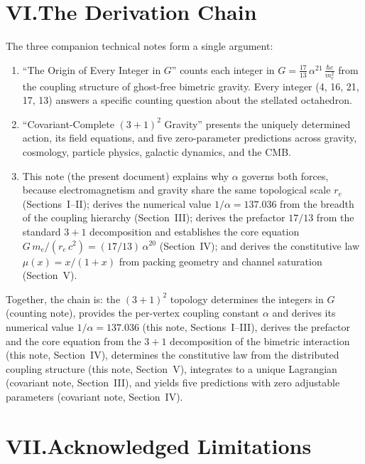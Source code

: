 \documentclass[11pt]{article}
\begin{document}
\section*{VI.\quad The Derivation Chain}

The three companion technical notes form a single argument:

\begin{enumerate}[leftmargin=2em]
\item ``The Origin of Every Integer in $G$'' counts each integer in $G = \frac{17}{13}\,\alpha^{21}\,\frac{\hbar c}{m_e^2}$ from the coupling structure of ghost-free bimetric gravity.
Every integer (4, 16, 21, 17, 13) answers a specific counting question about the stellated octahedron.

\item ``Covariant-Complete $(3+1)^2$ Gravity'' presents the uniquely determined action, its field equations, and five zero-parameter predictions across gravity, cosmology, particle physics, galactic dynamics, and the CMB.

\item This note (the present document) explains why $\alpha$ governs both forces, because electromagnetism and gravity share the same topological scale $r_e$ (Sections~I--II); derives the numerical value $1/\alpha = 137.036$ from the breadth of the coupling hierarchy (Section~III); derives the prefactor $17/13$ from the standard $3+1$ decomposition and establishes the core equation $G\,m_e/(r_e\,c^2) = (17/13)\,\alpha^{20}$ (Section~IV); and derives the constitutive law $\mu(x) = x/(1+x)$ from packing geometry and channel saturation (Section~V).
\end{enumerate}

Together, the chain is: the $(3+1)^2$ topology determines the integers in $G$ (counting note), provides the per-vertex coupling constant $\alpha$ and derives its numerical value $1/\alpha = 137.036$ (this note, Sections~I--III), derives the prefactor and the core equation from the $3+1$ decomposition of the bimetric interaction (this note, Section~IV), determines the constitutive law from the distributed coupling structure (this note, Section~V), integrates to a unique Lagrangian (covariant note, Section~III), and yields five predictions with zero adjustable parameters (covariant note, Section~IV).

\section*{VII.\quad Acknowledged Limitations}
\end{document}
